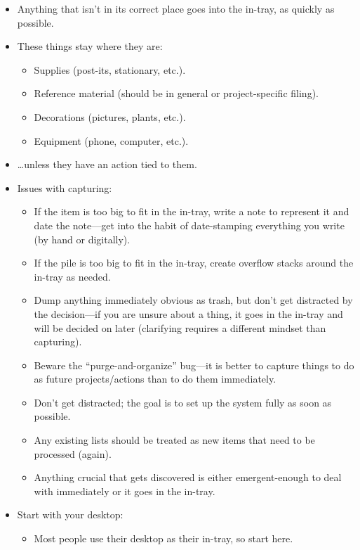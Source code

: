 \documentclass{article}
\begin{document}
\begin{itemize}
  \item Anything that isn't in its correct place goes into the in-tray, as quickly as possible.
  \item These things stay where they are:
  \begin{itemize}
    \item Supplies (post-its, stationary, etc.).
    \item Reference material (should be in general or project-specific filing).
    \item Decorations (pictures, plants, etc.).
    \item Equipment (phone, computer, etc.).
  \end{itemize}
  \item \ldots unless they have an action tied to them.
  \item Issues with capturing:
  \begin{itemize}
    \item If the item is too big to fit in the in-tray, write a note to represent it and date the note---get into the habit of date-stamping everything you write (by hand or digitally).
    \item If the pile is too big to fit in the in-tray, create overflow stacks around the in-tray as needed.
    \item Dump anything immediately obvious as trash, but don't get distracted by the decision---if you are unsure about a thing, it goes in the in-tray and will be decided on later (clarifying requires a different mindset than capturing).
    \item Beware the ``purge-and-organize'' bug---it is better to capture things to do as future projects/actions than to do them immediately.
    \item Don't get distracted; the goal is to set up the system fully as soon as possible.
    \item Any existing lists should be treated as new items that need to be processed (again).
    \item Anything crucial that gets discovered is either emergent-enough to deal with immediately or it goes in the in-tray.
  \end{itemize}
  \item Start with your desktop:
  \begin{itemize}
    \item Most people use their desktop as their in-tray, so start here.

\end{itemize}
\end{itemize}
\end{document}
